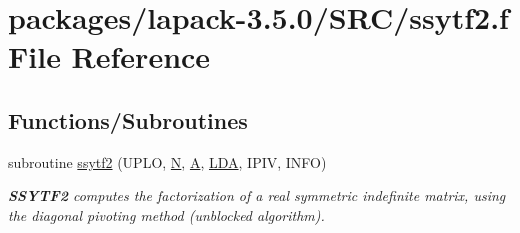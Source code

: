 \hypertarget{ssytf2_8f}{}\section{packages/lapack-\/3.5.0/\+S\+R\+C/ssytf2.f File Reference}
\label{ssytf2_8f}
\subsection*{Functions/\+Subroutines}
\begin{DoxyCompactItemize}
\item 
subroutine \hyperlink{group__realSYcomputational_ga7a22a184725b704bb892c4cb3cd2f872}{ssytf2} (U\+P\+L\+O, \hyperlink{polmisc_8c_a0240ac851181b84ac374872dc5434ee4}{N}, \hyperlink{classA}{A}, \hyperlink{example__user_8c_ae946da542ce0db94dced19b2ecefd1aa}{L\+D\+A}, I\+P\+I\+V, I\+N\+F\+O)
\begin{DoxyCompactList}\small\item\em {\bfseries S\+S\+Y\+T\+F2} computes the factorization of a real symmetric indefinite matrix, using the diagonal pivoting method (unblocked algorithm). \end{DoxyCompactList}\end{DoxyCompactItemize}
